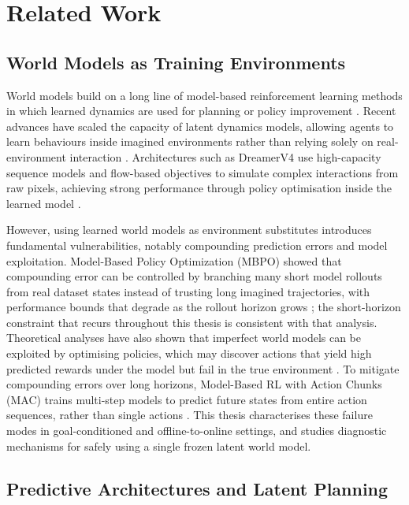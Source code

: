 \section{Related Work}

\subsection{World Models as Training Environments}

World models build on a long line of model-based reinforcement learning
methods in which learned dynamics are used for planning or policy
improvement \cite{dyna, ha2018worldmodels}. Recent advances
have scaled the capacity of latent dynamics models, allowing agents to
learn behaviours inside imagined environments rather than relying solely
on real-environment interaction \cite{hafner2020dreamer,hafner2025dreamerv4}.
Architectures such as DreamerV4 use high-capacity sequence models and
flow-based objectives to simulate complex interactions from raw pixels,
achieving strong performance through policy optimisation inside the
learned model \cite{hafner2025dreamerv4}.

However, using learned world models as environment substitutes
introduces fundamental vulnerabilities, notably compounding prediction
errors and model exploitation. Model-Based Policy Optimization (MBPO)
showed that compounding error can be controlled by branching many short
model rollouts from real dataset states instead of trusting long
imagined trajectories, with performance bounds that degrade as the
rollout horizon grows \cite{janner2019trust}; the short-horizon
constraint that recurs throughout this thesis is consistent with that
analysis. Theoretical analyses have also shown that
imperfect world models can be exploited by optimising policies, which
may discover actions that yield high predicted rewards under the model
but fail in the true environment
\cite{bhamidipaty2026imperfectworldmodelsexploitable}. To mitigate
compounding errors over long horizons, Model-Based RL with Action Chunks
(MAC) trains multi-step models to predict future states from entire
action sequences, rather than single actions
\cite{park2025scalableofflinemodelbasedrl}. This thesis characterises
these failure modes in goal-conditioned and offline-to-online settings,
and studies diagnostic mechanisms for safely using a single frozen
latent world model.

\subsection{Predictive Architectures and Latent Planning}

